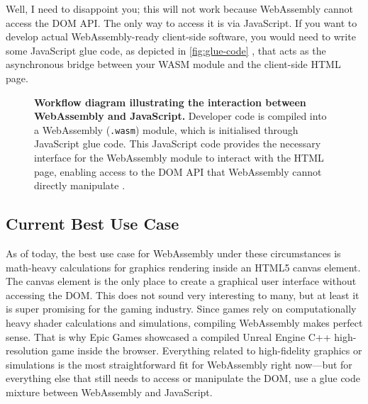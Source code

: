 \documentclass[10pt]{article}
\begin{document}
\begin{sloppypar}
  Well, I need to disappoint you; this will not work because WebAssembly cannot access the DOM API. The only way to access it is via JavaScript. If you want to develop actual WebAssembly-ready client-side software, you would need to write some JavaScript glue code, as depicted in \autoref{fig:glue-code} \citep{mihaylov_how_2018}, that acts as the asynchronous bridge between your WASM module and the client-side HTML page.

  \begin{figure}[ht]
    \centering
    \caption[Workflow diagram illustrating the interaction between WebAssembly and JavaScript.]{\textbf{Workflow diagram illustrating the interaction between WebAssembly and JavaScript.} Developer code is compiled into a WebAssembly (\lstinline{.wasm}) module, which is initialised through JavaScript glue code. This JavaScript code provides the necessary interface for the WebAssembly module to interact with the HTML page, enabling access to the DOM API that WebAssembly cannot directly manipulate \citep{mihaylov_how_2018}.}
    \label{fig:glue-code}
  \end{figure}

  \subsection{Current Best Use Case}
  \label{sec:use-cases}

  As of today, the best use case for WebAssembly under these circumstances is math-heavy calculations for graphics rendering inside an HTML5 canvas element. The canvas element is the only place to create a graphical user interface without accessing the DOM. This does not sound very interesting to many, but at least it is super promising for the gaming industry. Since games rely on computationally heavy shader calculations and simulations, compiling WebAssembly makes perfect sense. That is why Epic Games showcased a compiled Unreal Engine C++ high-resolution game inside the browser. Everything related to high-fidelity graphics or simulations is the most straightforward fit for WebAssembly right now—but for everything else that still needs to access or manipulate the DOM, use a glue code mixture between WebAssembly and JavaScript.


\end{sloppypar}
\end{document}
